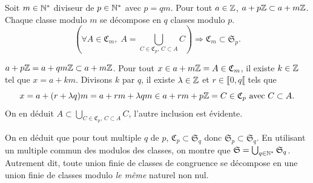 \begin{propn} \label{décompoClasse}
 Soit $m\in \mathbb{N}^*$ diviseur de $p\in \mathbb{N}^*$ avec $p=qm$.\newline
 Pour tout $a\in \mathbb{Z}$, $a + p\mathbb{Z} \subset a + m\mathbb{Z}$. Chaque classe modulo $m$ se décompose en $q$ classes modulo $p$.
 \begin{displaymath}
  \left( \forall A\in \mathfrak{C}_m, \;  A = \bigcup_{C \in \mathfrak{C}_p,\, C\subset A} C \right) \Rightarrow \mathfrak{C}_m \subset \mathfrak{S}_p.
 \end{displaymath}
\end{propn}
\begin{demo}
 $a + p \mathbb{Z} = a + qm\mathbb{Z} \subset a + m\mathbb{Z}$. Pour tout $x \in  a + m\mathbb{Z} = A \in \mathfrak{C}_m$, il existe $k \in \mathbb{Z}$ tel que $x = a + km$. Divisons $k$ par $q$, il existe $\lambda \in \mathbb{Z}$ et $r \in \llbracket 0, q\llbracket$ tels que
 \begin{displaymath}
  x = a + (r+\lambda q)m = a+rm + \lambda qm \in a+rm + p \mathbb{Z} = C \in \mathfrak{C}_p \text{ avec } C \subset A.
 \end{displaymath}
 On en déduit $A \subset \bigcup_{C \in \mathfrak{C}_p,\, C\subset A} C$, l'autre inclusion est évidente.
\end{demo}
 \label{ExpleZ}
 \noindent On en déduit que pour tout multiple $q$ de $p$, $\mathfrak{C}_p \subset \mathfrak{S}_q$ donc $\mathfrak{S}_p \subset \mathfrak{S}_q$. En utilisant un multiple commun des modulos des classes, on montre que $\mathfrak{S}= \bigcup_{q \in \mathbb{N}^*}\mathfrak{S}_q$. Autrement dit, toute union finie de classes de congruence se décompose en une union finie de classes modulo \emph{le même} naturel non nul.


